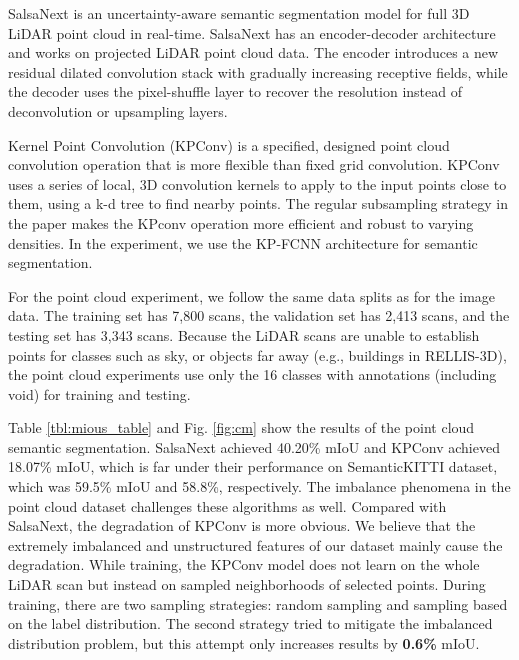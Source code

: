 \documentclass[letterpaper, 10 pt, conference]{ieeeconf}
\begin{document}
SalsaNext is an uncertainty-aware semantic segmentation model for full 3D LiDAR point cloud in real-time. SalsaNext has an encoder-decoder architecture and works on projected LiDAR point cloud data. The encoder introduces a new residual dilated convolution stack with gradually increasing receptive fields, while the decoder uses the pixel-shuffle layer to recover the resolution instead of deconvolution or upsampling layers.

Kernel Point Convolution (KPConv) is a specified, designed point cloud convolution operation that is more flexible than fixed grid convolution. KPConv uses a series of local, 3D convolution kernels to apply to the input points close to them, using a k-d tree to find nearby points. The regular subsampling strategy in the paper makes the KPconv operation more efficient and robust to varying densities. In the experiment, we use the KP-FCNN architecture \cite{Thomas2019} for semantic segmentation.

For the point cloud experiment, we follow the same data splits as for the image data. The training set has 7,800 scans, the validation set has 2,413 scans, and the testing set has 3,343 scans. Because the LiDAR scans are unable to establish points for classes such as sky, or objects far away (e.g., buildings in RELLIS-3D), the point cloud experiments use only the 16 classes with annotations (including void) for training and testing. 


Table \ref{tbl:mious_table} and Fig. \ref{fig:cm} show the results of the point cloud semantic segmentation. SalsaNext achieved 40.20\% mIoU and KPConv achieved 18.07\% mIoU, which is far under their performance on SemanticKITTI dataset, which was 59.5\% mIoU and 58.8\%, respectively. The imbalance phenomena in the point cloud dataset challenges these algorithms as well.
Compared with SalsaNext, the degradation of KPConv is more obvious. We believe that the extremely imbalanced and unstructured features of our dataset mainly cause the degradation. While training, the KPConv model does not learn on the whole LiDAR scan but instead on sampled neighborhoods of selected points. During training, there are two sampling strategies: random sampling and sampling based on the label distribution. The second strategy tried to mitigate the imbalanced distribution problem, but this attempt only increases results by \textbf{0.6\%} mIoU.
\end{document}
